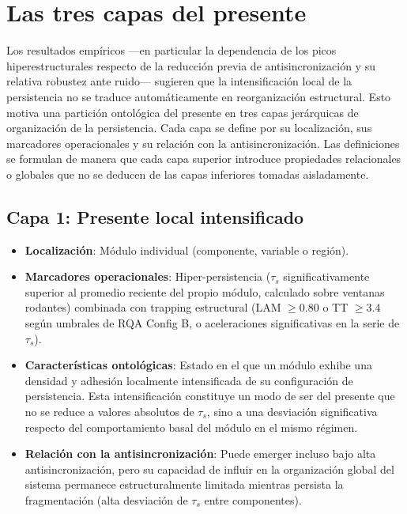 \section{Las tres capas del presente}

Los resultados empíricos —en particular la dependencia de los picos hiperestructurales respecto de la reducción previa de antisincronización y su relativa robustez ante ruido— sugieren que la intensificación local de la persistencia no se traduce automáticamente en reorganización estructural. Esto motiva una partición ontológica del presente en tres capas jerárquicas de organización de la persistencia. Cada capa se define por su localización, sus marcadores operacionales y su relación con la antisincronización. Las definiciones se formulan de manera que cada capa superior introduce propiedades relacionales o globales que no se deducen de las capas inferiores tomadas aisladamente.

\subsection{Capa 1: Presente local intensificado}

\begin{itemize}
    \item \textbf{Localización}: Módulo individual (componente, variable o región).
    \item \textbf{Marcadores operacionales}: Hiper-persistencia ($\tau_s$ significativamente superior al promedio reciente del propio módulo, calculado sobre ventanas rodantes) combinada con trapping estructural (LAM $\geq 0.80$ o TT $\geq 3.4$ según umbrales de RQA Config B, o aceleraciones significativas en la serie de $\tau_s$).
    \item \textbf{Características ontológicas}: Estado en el que un módulo exhibe una densidad y adhesión localmente intensificada de su configuración de persistencia. Esta intensificación constituye un modo de ser del presente que no se reduce a valores absolutos de $\tau_s$, sino a una desviación significativa respecto del comportamiento basal del módulo en el mismo régimen.
    \item \textbf{Relación con la antisincronización}: Puede emerger incluso bajo alta antisincronización, pero su capacidad de influir en la organización global del sistema permanece estructuralmente limitada mientras persista la fragmentación (alta desviación de $\tau_s$ entre componentes).
\end{itemize}

